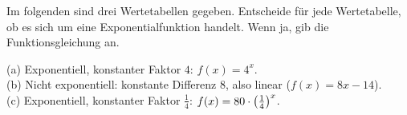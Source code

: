 \documentclass[11pt]{exam}
\begin{document}
\begin{questions}
\question[3]
Im folgenden sind drei Wertetabellen gegeben. Entscheide für jede Wertetabelle, ob es sich um eine Exponentialfunktion handelt. Wenn ja, gib die Funktionsgleichung an.
{\begin{solution}
		(a) Exponentiell, konstanter Faktor $4$: $f(x)=4^x$.\\
		(b) Nicht exponentiell: konstante Differenz $8$, also linear ($f(x)=8x-14$).\\
		(c) Exponentiell, konstanter Faktor $\frac{1}{4}$: $f(x)=80\cdot\left(\frac{1}{4}\right)^x$.
\end{solution}}
{\antwort{6}}



\end{questions}
\end{document}

